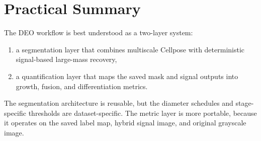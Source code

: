 \documentclass[11pt]{article}
\newcommand{\1}{\mathbf{1}}
\begin{document}
\section{Practical Summary}
The DEO workflow is best understood as a two-layer system:
\begin{enumerate}[leftmargin=1.8em]
  \item a segmentation layer that combines multiscale Cellpose with deterministic signal-based large-mass recovery,
  \item a quantification layer that maps the saved mask and signal outputs into growth, fusion, and differentiation metrics.
\end{enumerate}

The segmentation architecture is reusable, but the diameter schedules and stage-specific thresholds are dataset-specific. The metric layer is more portable, because it operates on the saved label map, hybrid signal image, and original grayscale image.
\end{document}
